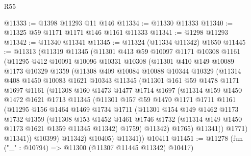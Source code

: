 \begin{lexlean}{R55}
\begin{coremodule}
@11333 := @1398 @11293 @11 @146
@11334 := @11330 @11333
@11340 := @11325 @59 @1171 @1171 @146 @1161 @11333
@11341 := @1298 @11293
@11342 := @11340 @11341
@11345 := @11324 (@11334 @11342) @1650
@11445 := @11313
    (@11319
      @11345
      (@11301
        @413
        @59
        @10097
        @1171
        @10308
        @1161
        (@11295
          @412
          @10091
          @10096
          @10331
          @10308
          (@11301
            @410
            @149
            @10089
            @1173
            @10329
            @1359
            (@11308
              @409
              @10084
              @10088
              @10344
              @10329
              (@11314
                @408
                @1450
                @10083
                @1621
                @10343
                @11345
                (@11301
                  @161
                  @59
                  @1478
                  @1171
                  @1697
                  @1161
                  (@11308
                    @160
                    @1473
                    @1477
                    @1714
                    @1697
                    (@11314
                      @159
                      @1450
                      @1472
                      @1621
                      @1713
                      @11345
                      (@11301
                        @157
                        @59
                        @1470
                        @1171
                        @1711
                        @1161
                        (@11295
                          @156
                          @1464
                          @1469
                          @1734
                          @1711
                          (@11301
                            @154
                            @149
                            @1462
                            @1173
                            @1732
                            @1359
                            (@11308
                              @153
                              @1452
                              @1461
                              @1746
                              @1732
                              (@11314 @149 @1450 @1173 @1621 @1359 @11345 @11342)
                              @1759)
                            @11342)
                          @1765)
                        @11341))
                    @1771)
                  @11341))
              @10399)
            @11342)
          @10405)
        @11341))
    @10411
@11451 := @11278 (fun ("_" : @10794) => @11300 (@11307 @11445 @11342) @10417)

\end{coremodule}
\end{lexlean}

